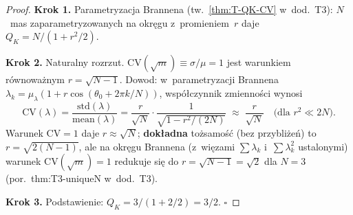 \begin{proof}
\textbf{Krok 1.} Parametryzacja Brannena (tw.~\ref{thm:T-QK-CV}
w~dod.~T3): $N$~mas zapara\-met\-ry\-zo\-wa\-nych
na okr\k{e}gu z~promieniem~$r$ daje
$Q_K = N/(1 + r^2/2)$.

\smallskip\noindent
\textbf{Krok 2.} Naturalny rozrzut.
$\mathrm{CV}(\sqrt{m}) \equiv \sigma/\mu = 1$ jest warunkiem
r\'ownowa\.znym $r = \sqrt{N - 1}$. Dowod:
w~parametryzacji Brannena
$\lambda_k = \mu_\lambda(1 + r\cos(\theta_0 + 2\pi k/N))$,
wsp\'o\l{}czynnik zmienno\'sci wynosi
\begin{equation}
  \mathrm{CV}(\lambda)
  = \frac{\mathrm{std}(\lambda)}{\mathrm{mean}(\lambda)}
  = \frac{r}{\sqrt{N}}\cdot\frac{1}{\sqrt{1 - r^2/(2N)}}
  \;\approx\; \frac{r}{\sqrt{N}}
  \quad\text{(dla }r^2 \ll 2N\text{)}.
\end{equation}
Warunek $\mathrm{CV} = 1$ daje $r \approx \sqrt{N}$;
\textbf{dok\l{}adna} to\.zsamo\'s\'c (bez przybli\.ze\'n)
to $r = \sqrt{2(N - 1)}$, ale na okr\k{e}gu Brannena
(z~wi\k{e}zami $\sum\lambda_k$ i~$\sum\lambda_k^2$ ustalonymi)
warunek $\mathrm{CV}(\sqrt{m}) = 1$
redukuje si\k{e} do $r = \sqrt{N - 1} = \sqrt{2}$ dla $N = 3$
(por.~thm:T3-uniqueN w~dod.~T3).

\smallskip\noindent
\textbf{Krok 3.} Podstawienie:
$Q_K = 3/(1 + 2/2) = 3/2$.
\hfill$\square$
\end{proof}

